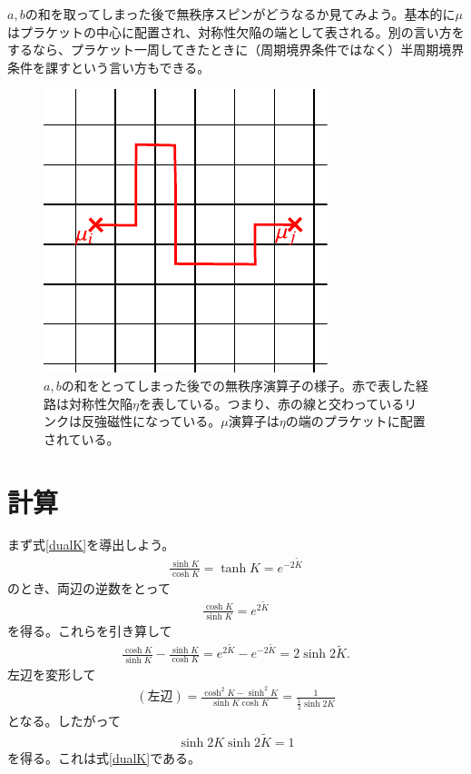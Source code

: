 \documentclass[a4paper,12pt,dvipdfmx]{jlreq}
\newcommand{\Kt}{\widetilde{K}}
\begin{document}
$a,b$の和を取ってしまった後で無秩序スピンがどうなるか見てみよう。基本的に$\mu$はプラケットの中心に配置され、対称性欠陥の端として表される。別の言い方をするなら、プラケット一周してきたときに（周期境界条件ではなく）半周期境界条件を課すという言い方もできる。


\begin{figure}[htbp]
  \centering
  \includegraphics{disorder2.pdf}
  \caption{$a,b$の和をとってしまった後での無秩序演算子の様子。赤で表した経路は対称性欠陥$\eta$を表している。つまり、赤の線と交わっているリンクは反強磁性になっている。$\mu$演算子は$\eta$の端のプラケットに配置されている。}
  \label{fig:disorder2}
\end{figure}

\appendix
\section{計算}
\label{sec:calculation}
まず式\eqref{dualK}を導出しよう。
\begin{align}
  \frac{\sinh K}{\cosh K}=\tanh K = e^{-2\Kt}
  \label{KKt}
\end{align}
のとき、両辺の逆数をとって
\begin{align}
  \frac{\cosh K}{ \sinh K} = e^{2\Kt}
\end{align}
を得る。これらを引き算して
\begin{align}
  \frac{\cosh K}{\sinh K}-\frac{\sinh K}{\cosh K}=e^{2\Kt}-e^{-2\Kt}=2\sinh 2\Kt.
\end{align}
左辺を変形して
\begin{align}
  (\text{左辺})=\frac{\cosh^2K-\sinh^2 K}{\sinh K \cosh K}=\frac{1}{\frac{1}{2}\sinh 2K}
\end{align}
となる。したがって
\begin{align}
  \sinh 2K \sinh 2\Kt =1
\end{align}
を得る。これは式\eqref{dualK}である。
\end{document}
